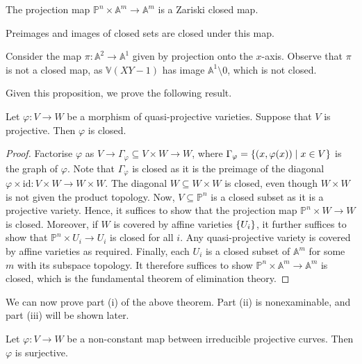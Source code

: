 \begin{proposition}
    The projection map \( \mathbb P^n \times \mathbb A^m \to \mathbb A^m \) is a Zariski closed map.
\end{proposition}
Preimages and images of closed sets are closed under this map.
\begin{remark}
    Consider the map \( \pi \colon \mathbb A^2 \to \mathbb A^1 \) given by projection onto the \( x \)-axis.
    Observe that \( \pi \) is not a closed map, as \( \mathbb V(XY - 1) \) has image \( \mathbb A^1 \setminus \qty{0} \), which is not closed.
\end{remark}
Given this proposition, we prove the following result.
\begin{proposition}
    Let \( \varphi \colon V \to W \) be a morphism of quasi-projective varieties.
    Suppose that \( V \) is projective.
    Then \( \varphi \) is closed.
\end{proposition}
\begin{proof}
    Factorise \( \varphi \) as \( V \to \Gamma_\varphi \subseteq V \times W \to W \), where \( \Gamma_\varphi = \qty{(x, \varphi(x)) \mid x \in V} \) is the graph of \( \varphi \).
    Note that \( \Gamma_\varphi \) is closed as it is the preimage of the diagonal \( \varphi \times \mathrm{id} \colon V \times W \to W \times W \).
    The diagonal \( W \subseteq W \times W \) is closed, even though \( W \times W \) is not given the product topology.
    Now, \( V \subseteq \mathbb P^n \) is a closed subset as it is a projective variety.
    Hence, it suffices to show that the projection map \( \mathbb P^n \times W \to W \) is closed.
    Moreover, if \( W \) is covered by affine varieties \( \qty{U_i} \), it further suffices to show that \( \mathbb P^n \times U_i \to U_i \) is closed for all \( i \).
    Any quasi-projective variety is covered by affine varieties as required.
    Finally, each \( U_i \) is a closed subset of \( \mathbb A^m \) for some \( m \) with its subspace topology.
    It therefore suffices to show \( \mathbb P^n \times \mathbb A^m \to \mathbb A^m \) is closed, which is the fundamental theorem of elimination theory.
\end{proof}
We can now prove part (i) of the above theorem.
Part (ii) is nonexaminable, and part (iii) will be shown later.
\begin{corollary}
    Let \( \varphi \colon V \to W \) be a non-constant map between irreducible projective curves.
    Then \( \varphi \) is surjective.
\end{corollary}
